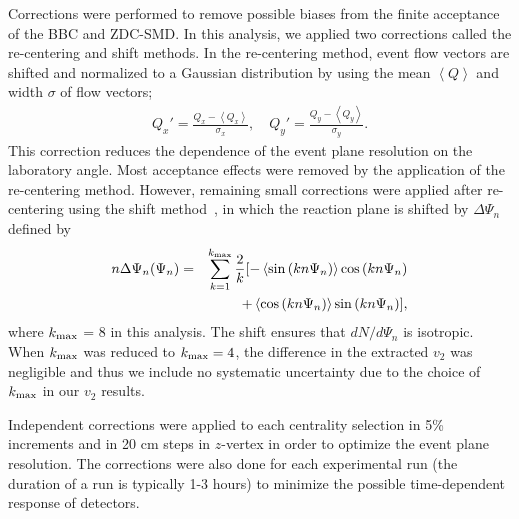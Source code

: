 \documentclass[aps,prc,superscriptaddress,showpacs,floatfix,twocolumn]{revtex4}
\begin{document}
Corrections were performed to remove possible biases from the finite acceptance of the BBC and ZDC-SMD. 
In this analysis, we applied two corrections called the re-centering and shift methods. In the re-centering 
method, event flow vectors are shifted and normalized to a Gaussian distribution by using the mean $\left<Q\right>$ 
and width $\sigma$ of flow vectors;
\begin{eqnarray}
 Q_x' = \frac{Q_x - \left<Q_x\right>}{\sigma_x},\quad
 Q_y' = \frac{Q_y - \left<Q_y\right>}{\sigma_y}.
\end{eqnarray}
This correction reduces the dependence of the event plane resolution on the laboratory angle. Most acceptance 
effects were removed by the application of the re-centering method. However, remaining small corrections were 
applied after re-centering using the shift method~\cite{Poskanzer:1998yz}, in which the reaction plane is 
shifted by $\Delta\Psi_n$ defined by   
\begin{eqnarray}
n\Delta\Psi_n (\Psi_n) & = & \sum_{k=1}^{k_{\rm max}} \frac{2}{k} [ - \left<\sin{(kn\Psi_n)}\right>\cos{(kn\Psi_n)} \nonumber \\
& & ~ + \left<\cos{(kn\Psi_n)}\right>\sin{(kn\Psi_n)} ],
\label{eq:shift_correction}
\end{eqnarray}
where $k_{\rm max}$ = 8 in this analysis. The shift ensures that $dN/d\Psi_n$ is isotropic.
When $k_{\rm max}$ was reduced to $k_{\rm max} = 4$, the difference in the extracted $v_2$ was 
negligible and thus we include no systematic uncertainty due to the choice of $k_{\rm max}$ in our 
$v_2$ results.

Independent corrections were applied to each centrality selection in 5\% increments and in 20 cm steps 
in $z$-vertex in order to optimize the event plane resolution. The corrections were also done for each 
experimental run (the duration of a run is typically 1-3 hours) to minimize the possible time-dependent 
response of detectors.
\end{document}
